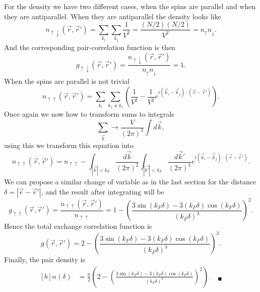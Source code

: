 
\begin{questions}
\begin{solution}
For the density we have two different cases, when the spins are parallel and when they are antiparallel. When they are antiparallel the density looks like
\begin{equation}
  n_{\uparrow \downarrow} (\vec{r},\vec{r}') = \sum_{k_i}\sum_{k_j} \frac{1}{V^2} = \frac{(N/2)(N/2)}{V^2} = n_\uparrow n_\downarrow.
\end{equation}
And the corresponding pair-correlation function is then
\begin{equation}
  g_{\uparrow \downarrow} (\vec{r},\vec{r}')  = \frac{n_{\uparrow \downarrow} (\vec{r},\vec{r}')}{n_\uparrow n_\downarrow} = 1.
\end{equation}
When the spins are parallel is not trivial
\begin{equation}
  n_{\uparrow \uparrow}(\vec{r},\vec{r}') = \sum_{k_i} \sum_{k_j\neq k_i} \left( \frac{1}{V^2} - \frac{1}{V^2}e^{i(\vec{k}_i - \vec{k}_j)\cdot(\vec{r}- \vec{r}')} \right).
\end{equation}
Once again we now how to transform sums to integrals
\begin{equation}
  \sum_{\vec{k}} \longrightarrow \frac{V}{(2\pi)^3} \int d\vec{k},
\end{equation}
using this we transform this equation into
\begin{equation}
  n_{\uparrow \uparrow}(\vec{r},\vec{r}') = n_{\uparrow \uparrow} - \int_{|\vec{k}|<k_F} \frac{d \vec{k}}{(2\pi)^2} \int_{|\vec{k'}|<k_F} \frac{d \vec{k}'}{(2\pi)^3} e^{i(\vec{k}_i - \vec{k}_j)\cdot(\vec{r}- \vec{r}')} .
\end{equation}
We can propose a similar change of variable as in the last section for the distance $\delta = |\vec{r} - \vec{r}'|$, and the result after integrating will be
\begin{equation}
  g_{\uparrow \uparrow}(\vec{r},\vec{r}') = \frac{n_{\uparrow \uparrow}(\vec{r},\vec{r}')}{n_{\uparrow \uparrow}} = 1 - \left( \frac{3\sin(k_F\delta) - 3(k_F\delta)\cos(k_F\delta)}{(k_F\delta)^3} \right)^2.
\end{equation}
Hence the total exchange correlation function is
\begin{equation}
  g(\vec{r},\vec{r}')  = 2 - \left( \frac{3\sin(k_F\delta) - 3(k_F\delta)\cos(k_F\delta)}{(k_F\delta)^3} \right)^2.
\end{equation}
Finally, the pair density is
\begin{equation}
  \begin{aligned}[b]
    n(\delta) &= \frac{n}{2}\left( 2 - \left( \frac{3\sin(k_F\delta) - 3(k_F\delta)\cos(k_F\delta)}{(k_F\delta)^3} \right)^2\right). \quad_\blacksquare
  \end{aligned}
\end{equation}


\end{solution}
\end{questions}
